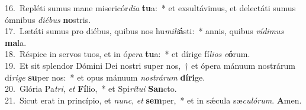 {16.~}Repléti sumus mane misericór\textit{di}\textit{a} \textbf{tu}a:~* et exsultávimus, et delectáti sumus ómnibus \textit{di}\textit{é}\textit{bus} \textbf{no}stris.\\
{17.~}Lætáti sumus pro diébus, quibus nos hu\textit{mi}\textit{li}\textbf{á}sti:~* annis, quibus \textit{ví}\textit{di}\textit{mus} \textbf{ma}la.\\
{18.~}Réspice in servos tuos, et in ó\textit{pe}\textit{ra} \textbf{tu}a:~* et dírige fí\textit{li}\textit{os} \textit{e}\textbf{ó}rum.\\
{19.~}Et sit splendor Dómini Dei nostri super nos,~† et ópera mánuum nostrárum dí\textit{ri}\textit{ge} \textbf{su}per nos:~* et opus mánuum \textit{no}\textit{strá}\textit{rum} \textbf{dí}\textbf{ri}ge.\\
{20.~}Glória Pa\textit{tri}, \textit{et} \textbf{Fí}lio,~* et Spi\textit{rí}\textit{tu}\textit{i} \textbf{San}cto.\\
{21.~}Sicut erat in princípio, et \textit{nunc}, \textit{et} \textbf{sem}per,~* et in sǽcula sæ\textit{cu}\textit{ló}\textit{rum}. \textbf{A}men.\\

